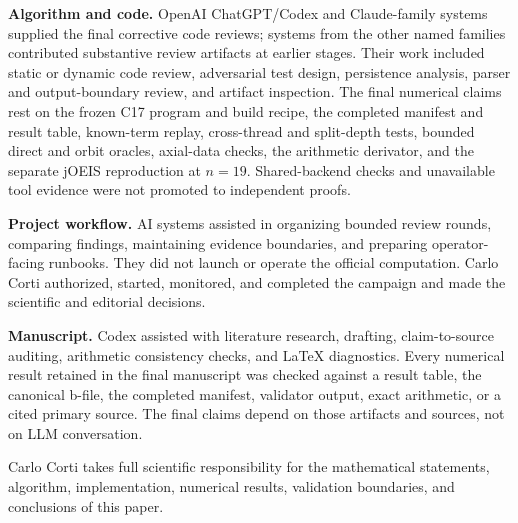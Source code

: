 \documentclass[11pt]{article}
\theoremstyle{definition}
\theoremstyle{remark}
\begin{document}
\textbf{Algorithm and code.}
OpenAI ChatGPT/Codex and Claude-family systems supplied the final corrective
code reviews; systems from the other named families contributed substantive
review artifacts at earlier stages.  Their work included static or dynamic
code review, adversarial test design, persistence analysis, parser and
output-boundary review, and artifact inspection.  The final numerical claims
rest on the frozen C17 program and build recipe, the completed manifest and result table,
known-term replay, cross-thread and split-depth tests, bounded direct and orbit
oracles, axial-data checks, the arithmetic derivator, and the separate jOEIS
reproduction at $n=19$.  Shared-backend checks and unavailable tool evidence
were not promoted to independent proofs.

\textbf{Project workflow.}
AI systems assisted in organizing bounded review rounds, comparing findings,
maintaining evidence boundaries, and preparing operator-facing runbooks.  They
did not launch or operate the official computation.  Carlo Corti authorized,
started, monitored, and completed the campaign and made the scientific and
editorial decisions.

\textbf{Manuscript.}
Codex assisted with literature research, drafting, claim-to-source auditing,
arithmetic consistency checks, and LaTeX diagnostics.  Every numerical result
retained in the final manuscript was checked against a result table, the canonical
b-file, the completed manifest, validator output, exact arithmetic, or a cited
primary source.  The final claims depend on those artifacts and sources, not
on LLM conversation.

Carlo Corti takes full scientific responsibility for the mathematical
statements, algorithm, implementation, numerical results, validation
boundaries, and conclusions of this paper.
\end{document}
